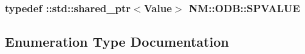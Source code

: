 \subsubsection[{S\+P\+V\+A\+L\+U\+E}]{\setlength{\rightskip}{0pt plus 5cm}typedef \+::std\+::shared\+\_\+ptr$<${\bf Value}$>$ {\bf N\+M\+::\+O\+D\+B\+::\+S\+P\+V\+A\+L\+U\+E}}\label{namespace_n_m_1_1_o_d_b_a76ab348a70a5cf877035b8281bdd3f7b}


\subsection{Enumeration Type Documentation}
\hypertarget{namespace_n_m_1_1_o_d_b_a3c1c138c7d11b589aaa8863b6a8c1317}{}

